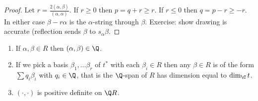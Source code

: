 \documentclass[a4paper]{article}
\begin{document}
\begin{proof}
  Let \(r = \frac{2(\alpha, \beta)}{(\alpha, \alpha)}\). If \(r \geq 0\) then \(p = q + r \geq r\). If \(r \leq 0\) then \(q = p - r \geq -r\). In either case \(\beta - r \alpha\) is the \(\alpha\)-string through \(\beta\). Exercise: show drawing is accurate (reflection sends \(\beta\) to \(s_\alpha \beta\).
\end{proof}

\begin{proposition}\leavevmode
  \begin{enumerate}
  \item If \(\alpha, \beta \in R\) then \((\alpha, \beta) \in \Q\).
  \item If we pick a basis \(\beta_1, \dots \beta_r\) of \(t^*\) with each \(\beta_i \in R\) then any \(\beta \in R\) is of the form \(\sum q_i \beta_i\) with \(q_i \in \Q\), that is the \(\Q\)-span of \(R\) has dimension equal to \(\dim_\C t\).
  \item \((\cdot, \cdot)\) is positive definite on \(\Q R\).
  \end{enumerate}
\end{proposition}
\end{document}
